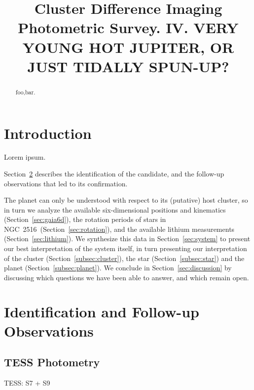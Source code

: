 \documentclass[12pt,twocolumn,tighten]{aastex63}
\newcommand{\cn}{NGC~2516} %
\begin{document}

\title{
  Cluster Difference Imaging Photometric Survey. IV.
  VERY YOUNG HOT JUPITER, OR JUST TIDALLY SPUN-UP?
}



\begin{abstract}
  foo,bar.
\end{abstract}




\section{Introduction}

Lorem ipsum.

Section~\ref{sec:observations} describes the identification of the
candidate, and the follow-up observations that led to its confirmation.

The planet can only be understood with respect to its (putative)
host cluster, so in turn we analyze the
available six-dimensional positions and kinematics (Section~\ref{sec:gaia6d}),
the rotation periods of stars in \cn\ 
(Section~\ref{sec:rotation}), and the available lithium measurements
(Section~\ref{sec:lithium}).
We synthesize this data in
Section~\ref{sec:system} to present our best interpretation of the
system itself, in turn presenting our interpretation of the
cluster
(Section~\ref{subsec:cluster}), the star (Section~\ref{subsec:star})
and the planet (Section~\ref{subsec:planet}).  We conclude in
Section~\ref{sec:discussion} by discussing which questions we have
been able to answer, and which remain open.



\section{Identification and Follow-up Observations}
\label{sec:observations}


  \subsection{TESS Photometry}
  \label{subsec:tess}
  TESS: S7 + S9
\end{document}
